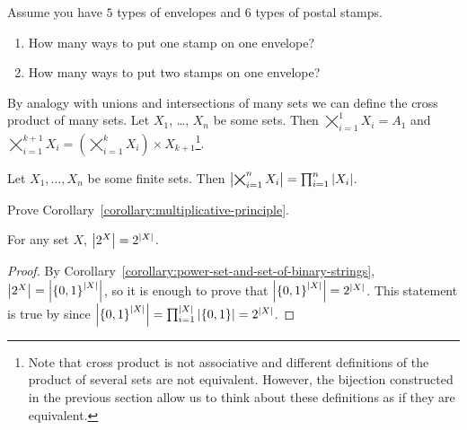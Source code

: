 \begin{exercise}
  Assume you have $5$ types of envelopes and $6$ types of postal stamps.
  \begin{enumerate}
    \item How many ways to put one stamp on one envelope?
    \item How many ways to put two stamps on one envelope?
  \end{enumerate}
\end{exercise}

By analogy with unions and intersections of many sets we can define the cross
product of many sets.
Let $X_1$, \dots, $X_n$ be some sets. Then $\bigtimes_{i = 1}^1 X_i = A_1$ and
$\bigtimes_{i = 1}^{k + 1} X_i =
  \left(\bigtimes_{i = 1}^k X_i\right) \times X_{k + 1}$\footnote{%
    Note that cross product is not associative and different definitions of the
    product of several sets are not equivalent. However, the bijection
    constructed in the previous section allow us to think about these
    definitions as if they are equivalent.
}.

\begin{corollary}
\label{corollary:multiplicative-principle}
  Let $X_1, \dots, X_n$ be some finite sets. Then
  $\left|{\bigtimes_{i = 1}^n X_i}\right| = \prod_{i = 1}^n \left|{X_i}\right|$.
\end{corollary}

\begin{exercise}
  Prove Corollary~\ref{corollary:multiplicative-principle}.
\end{exercise}

\begin{theorem}
\label{theorem:cardinality-of-power-set}
  For any set $X$, $\cardinality{\subsets{X}} = 2^{\cardinality{X}}$.
\end{theorem}
\begin{proof}
  By Corollary~\ref{corollary:power-set-and-set-of-binary-strings},
  $\cardinality{\subsets{X}} =
  \cardinality{\functions{\cardinality{X}}{\set{0, 1}}}$, so it is enough to
  prove that $\cardinality{\set{0, 1}^{\cardinality{X}}} = \subsets{\cardinality{X}}$. 
  This statement is true by  since 
  $\cardinality{\set{0, 1}^{\cardinality{X}}} =
  \prod_{i = 1}^{\cardinality{X}} \cardinality{\set{0, 1}} = 
    2^{\cardinality{X}}$.
\end{proof}

